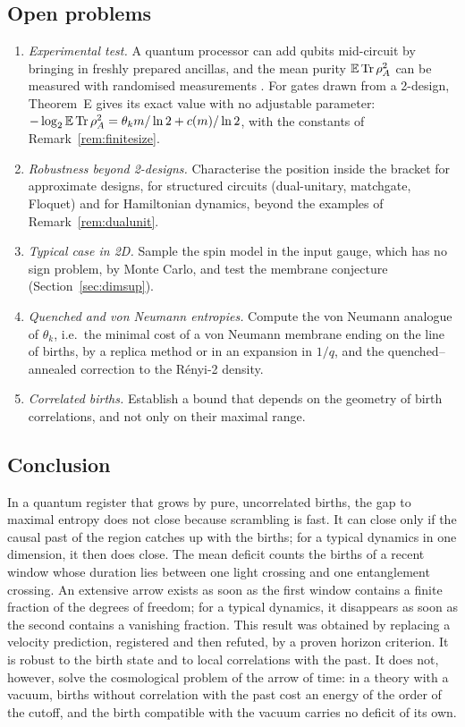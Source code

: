 \subsection{Open problems}

\begin{enumerate}[leftmargin=*,itemsep=2pt]
\item \emph{Experimental test.} A quantum processor can add qubits mid-circuit by bringing in freshly prepared ancillas, and the mean purity $\mathbb{E}\,\mathrm{Tr}\,\rho_A^2$ can be measured with randomised measurements \cite{Brydges2019}. For gates drawn from a 2-design, Theorem~E gives its exact value with no adjustable parameter: $-\log_2\mathbb{E}\,\mathrm{Tr}\,\rho_A^2=\theta_k m/\ln2+c(m)/\ln 2$, with the constants of Remark~\ref{rem:finitesize}.
\item \emph{Robustness beyond 2-designs.} Characterise the position inside the bracket for approximate designs, for structured circuits (dual-unitary, matchgate, Floquet) and for Hamiltonian dynamics, beyond the examples of Remark~\ref{rem:dualunit}.
\item \emph{Typical case in 2D.} Sample the spin model in the input gauge, which has no sign problem, by Monte Carlo, and test the membrane conjecture (Section~\ref{sec:dimsup}).
\item \emph{Quenched and von Neumann entropies.} Compute the von Neumann analogue of $\theta_k$, i.e.\ the minimal cost of a von Neumann membrane ending on the line of births, by a replica method or in an expansion in $1/q$, and the quenched--annealed correction to the R\'enyi-2 density.
\item \emph{Correlated births.} Establish a bound that depends on the geometry of birth correlations, and not only on their maximal range.
\end{enumerate}

\subsection{Conclusion}

In a quantum register that grows by pure, uncorrelated births, the gap to maximal entropy does not close because scrambling is fast. It can close only if the causal past of the region catches up with the births; for a typical dynamics in one dimension, it then does close. The mean deficit counts the births of a recent window whose duration lies between one light crossing and one entanglement crossing. An extensive arrow exists as soon as the first window contains a finite fraction of the degrees of freedom; for a typical dynamics, it disappears as soon as the second contains a vanishing fraction. This result was obtained by replacing a velocity prediction, registered and then refuted, by a proven horizon criterion. It is robust to the birth state and to local correlations with the past. It does not, however, solve the cosmological problem of the arrow of time: in a theory with a vacuum, births without correlation with the past cost an energy of the order of the cutoff, and the birth compatible with the vacuum carries no deficit of its own.

